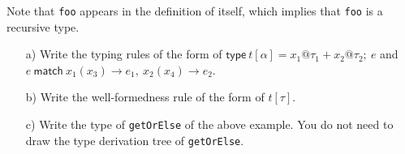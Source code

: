 \begin{enumerate}
Note that \texttt{foo} appears in the definition of itself, which implies that
\texttt{foo} is a recursive type.

\begin{enumerate}
\item[a)]
  Write the typing rules of the form
     of
    $\textsf{type}\ t[\alpha]=x_1@\tau_1+x_2@\tau_2;\ e$ and
    $e\ \textsf{match}\ x_1(x_3)\rightarrow e_1,\ x_2(x_4)\rightarrow e_2$.
\item[b)]
  Write the well-formedness rule of the form
    \fbox{$\Gamma\vdash\tau$} of $t[\tau]$.
\item[c)]
  Write the type of \texttt{getOrElse} of the above example. You do not need to
    draw the type derivation tree of \texttt{getOrElse}.
\end{enumerate}



\end{enumerate}
